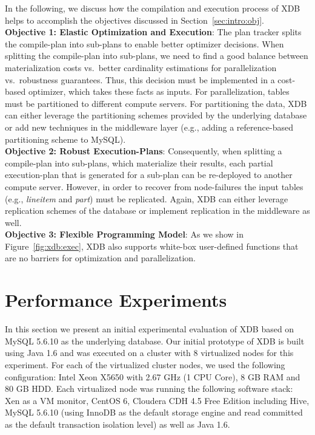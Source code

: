 \documentclass{sig-alternate}
\begin{document}
In the following, we discuss how the compilation and execution process of XDB helps to accomplish the objectives discussed in Section~\ref{sec:intro:obj}.\\

{\bf Objective 1:  Elastic Optimization and Execution}: The plan tracker splits the compile-plan into sub-plans to enable better optimizer decisions. When splitting the compile-plan into sub-plans, we need to find a good balance between materialization costs vs.\ better cardinality estimations for parallelization vs.\ robustness guarantees. Thus, this decision must be implemented in a cost-based optimizer, which takes these facts as inputs. For parallelization,  tables must be partitioned to different compute servers. For partitioning the data, XDB can either leverage the partitioning schemes provided by the underlying database or add new techniques in the middleware layer (e.g., adding a reference-based partitioning scheme to MySQL).\\

{\bf Objective 2:  Robust Execution-Plans}: Consequently, when splitting a compile-plan into sub-plans, which materialize their results, each partial execution-plan that is generated for a sub-plan can be re-deployed to another compute server. However, in order to recover from node-failures the input tables (e.g., \emph{lineitem} and \emph{part}) must be replicated. Again, XDB can either leverage replication schemes of the database or implement replication in the middleware as well.\\

{\bf Objective 3:  Flexible Programming Model}: As we show in Figure~\ref{fig:xdb:exec}, XDB also supports white-box user-defined functions that are no barriers for optimization and parallelization. 

\section{Performance Experiments}
\label{sec:perf}

In this section we present an initial experimental evaluation of XDB based on MySQL 5.6.10 as the underlying database. Our initial prototype of XDB is built using Java 1.6 and was executed on a cluster with 8 virtualized nodes for this experiment.  
For each of the virtualized cluster nodes, we used the following configuration: Intel Xeon X5650 with 2.67 GHz (1 CPU Core), 8 GB RAM and 80 GB HDD. Each virtualized node was running the following software stack: Xen as a VM monitor, CentOS 6, Cloudera CDH 4.5 Free Edition including Hive, MySQL 5.6.10 (using InnoDB as the default storage engine and read committed as the default transaction isolation level) as well as Java 1.6.
\end{document}
